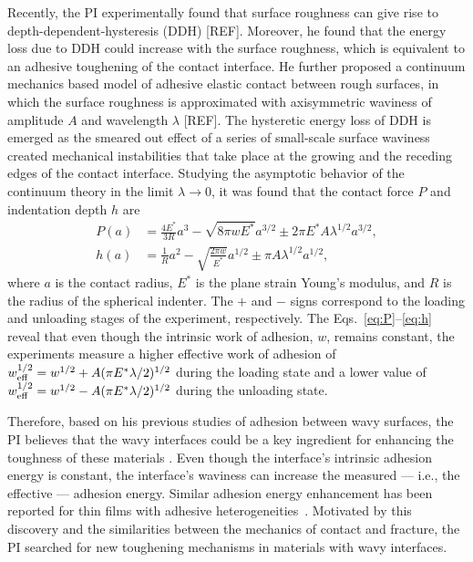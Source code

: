 \documentclass[10pt,letterpaper]{article}
\begin{document}
Recently, the PI experimentally found that surface roughness can give rise to depth-dependent-hysteresis (DDH) [REF].
%
Moreover, he found that the energy loss due to DDH could increase with the surface roughness, which is equivalent to an adhesive toughening of the contact interface.
%
He further proposed a continuum mechanics based model of adhesive elastic contact between rough surfaces, in which the surface roughness is approximated with axisymmetric waviness of amplitude $A$ and wavelength $\lambda$ [REF]. 
%
The hysteretic energy loss of DDH is emerged as the smeared out effect of a series of small-scale surface waviness created mechanical instabilities that take place at the growing and the receding edges of the contact interface. 
%
Studying the asymptotic behavior of the continuum theory in the limit $\lambda \to 0$, it was found that the contact force $P$ and indentation depth $h$ are
\begin{subequations}
\label{eq:P-h}
\begin{align}
	P(a) &= \frac{4E^*}{3R}a^3 - \sqrt{8\pi w E^*} a^{3/2} \pm 2\pi E^* A \lambda^{1/2} a^{3/2}, \label{eq:P}\\
	h(a) &= \frac{1}{R}a^2 - \sqrt{\frac{2\pi w}{E^*}}a^{1/2} \pm \pi A \lambda^{1/2} a^{1/2}, \label{eq:h}
\end{align}
\end{subequations}
%
where $a$ is the contact radius, $E^*$ is the plane strain Young's modulus, and $R$ is the radius of the spherical indenter. 
%
The $+$ and $-$ signs correspond to the loading and unloading stages of the experiment, respectively. 
%
The Eqs.~\eqref{eq:P}--\eqref{eq:h} reveal that even though the intrinsic work of adhesion, $w$, remains constant, the experiments measure a higher effective work of adhesion of $w_{\rm eff}^{1/2} = w^{1/2} + A(\pi E^* \lambda/2)^{1/2}$ during the loading state and a lower value of $w_{\rm eff}^{1/2} = w^{1/2} - A(\pi E^* \lambda/2)^{1/2}$ during the unloading state. 
%




Therefore, based on his previous studies of adhesion between wavy surfaces, the PI believes that the wavy interfaces could be a key ingredient for enhancing the toughness of these materials \cite{li2012numerical,wang2012specific,zavattieri2007determination,haghpanah2014adhesively}. 
%
Even though the interface's intrinsic adhesion energy is constant, the interface's waviness can increase the measured --- i.e., the effective --- adhesion energy. 
%
Similar adhesion energy enhancement has been reported for thin films with adhesive heterogeneities~\cite{xia2015adhesion}. 
%
Motivated by this discovery and the similarities between the mechanics of contact and fracture, the PI searched for new toughening mechanisms in materials with wavy interfaces.
\end{document}
